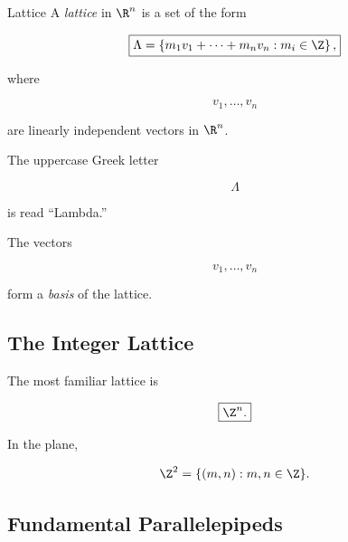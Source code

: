 \begin{definitionbox}{Lattice}
A \emph{lattice} in \(\R^n\) is a set of the form

\[
\boxed{
\Lambda
=
\left\{
m_1v_1+\cdots+m_nv_n:
m_i\in\Z
\right\},
}
\]

where

\[
v_1,\ldots,v_n
\]

are linearly independent vectors in \(\R^n\).
\end{definitionbox}

The uppercase Greek letter

\[
\Lambda
\]

is read ``Lambda.''

The vectors

\[
v_1,\ldots,v_n
\]

form a \emph{basis} of the lattice.

\subsection{The Integer Lattice}
\label{subsec:integer-lattice}

The most familiar lattice is

\[
\boxed{
\Z^n.
}
\]

In the plane,

\[
\Z^2
=
\{(m,n):m,n\in\Z\}.
\]

\begin{centereddiagram}
\end{centereddiagram}

\subsection{Fundamental Parallelepipeds}
\label{subsec:fundamental-parallelepipeds}

